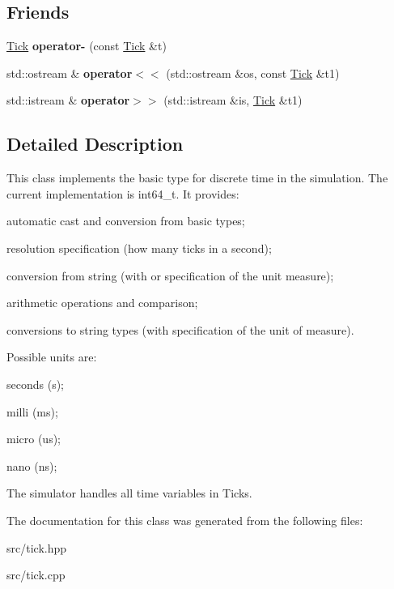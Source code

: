 \subsection*{Friends}
\begin{DoxyCompactItemize}
\item 
\hyperlink{classMetaSim_1_1Tick}{Tick} {\bfseries operator-\/} (const \hyperlink{classMetaSim_1_1Tick}{Tick} \&t)\hypertarget{classMetaSim_1_1Tick_aa8d3167141658b82d617d13d84345fed}{}\label{classMetaSim_1_1Tick_aa8d3167141658b82d617d13d84345fed}

\item 
std\+::ostream \& {\bfseries operator$<$$<$} (std\+::ostream \&os, const \hyperlink{classMetaSim_1_1Tick}{Tick} \&t1)\hypertarget{classMetaSim_1_1Tick_af4fdac13f8cbc225c2346e2c4005e80e}{}\label{classMetaSim_1_1Tick_af4fdac13f8cbc225c2346e2c4005e80e}

\item 
std\+::istream \& {\bfseries operator$>$$>$} (std\+::istream \&is, \hyperlink{classMetaSim_1_1Tick}{Tick} \&t1)\hypertarget{classMetaSim_1_1Tick_a04a36649b1dfd58da0ee6cf4770af5a5}{}\label{classMetaSim_1_1Tick_a04a36649b1dfd58da0ee6cf4770af5a5}

\end{DoxyCompactItemize}


\subsection{Detailed Description}
This class implements the basic type for discrete time in the simulation. The current implementation is int64\+\_\+t. It provides\+:


\begin{DoxyItemize}
\item automatic cast and conversion from basic types;
\item resolution specification (how many ticks in a second);
\item conversion from string (with or specification of the unit measure);
\item arithmetic operations and comparison;
\item conversions to string types (with specification of the unit of measure).
\end{DoxyItemize}

Possible units are\+:


\begin{DoxyItemize}
\item seconds (s);
\item milli (ms);
\item micro (us);
\item nano (ns);
\end{DoxyItemize}

The simulator handles all time variables in Ticks. 

The documentation for this class was generated from the following files\+:\begin{DoxyCompactItemize}
\item 
src/tick.\+hpp\item 
src/tick.\+cpp\end{DoxyCompactItemize}
